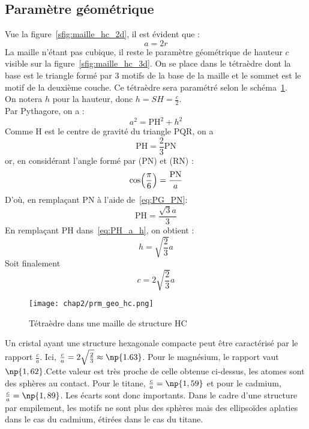 \subsection{Paramètre géométrique}
Vue la figure~\ref{sfig:maille_hc_2d}, il est évident que :
\begin{equation}
    a = 2r \label{eq;a_r_hc}
\end{equation}
La maille n'étant pas cubique, il reste le paramètre géométrique
de hauteur $c$ visible sur la figure~\ref{sfig:maille_hc_3d}.
On se place dans le tétraèdre dont la base est le triangle formé
par 3 motifs de la base de la maille et le sommet est le motif
de la deuxième couche. Ce tétraèdre sera paramétré selon le
schéma~\ref{fig:prm_geo_hc}.\\
On notera $h$ pour la hauteur, donc $h = SH = \frac{c}{2}$.\\
Par Pythagore, on a :
\begin{equation}
    a^2 = \text{PH}^2 + h^2 \label{eq:PH_a_h}
\end{equation}
Comme H est le centre de gravité du triangle PQR, on a
\begin{equation}
    \text{PH} = \frac{2}{3}\text{PN}\label{eq:PG_PN}
\end{equation}
or, en considérant l'angle formé par (PN) et (RN) :
\begin{equation*}
    \cos\Bigl( \frac{\pi}{6}\Bigr) = \frac{\text{PN}}{a}
\end{equation*}
D'où, en remplaçant PN à l'aide de~\ref{eq:PG_PN}:
\begin{equation}
    \text{PH} = \frac{\sqrt{3}a}{3}\label{eq:PH_a}
\end{equation}
En remplaçant PH dans~\ref{eq:PH_a_h}, on obtient :
\begin{equation*}
    h = \sqrt{\frac{2}{3}}a
\end{equation*}
Soit finalement
\begin{equation}
    \boxed{c=2\sqrt{\frac{2}{3}}a} \label{eq:c_hc}
\end{equation}
\begin{figure}
    \centering
    \texttt{[image: chap2/prm\_geo\_hc.png]}
    \caption{Tétraèdre dans une maille
        de structure HC}\label{fig:prm_geo_hc}
\end{figure}
\begin{rem}
    Un cristal ayant une structure hexagonale compacte
    peut être caractérisé par le rapport $\frac{c}{a}$.
    Ici, $\frac{c}{a} = 2\sqrt{\frac{2}{3}}\approx \np{1.63}$.
    Pour le magnésium, le rapport vaut
    $\np{1,62}$.Cette valeur est très proche de celle
    obtenue ci-dessus, les atomes sont des sphères
    au contact. Pour le titane,
    $\frac{c}{a}=\np{1,59}$ et pour le cadmium,
    $\frac{c}{a}=\np{1,89}$. Les écarts sont donc
    importants. Dans le cadre d’une structure par empilement,
    les motifs ne sont plus des sphères mais des ellipsoïdes
    aplaties dans le cas du cadmium, étirées dans le cas du titane.
\end{rem}

